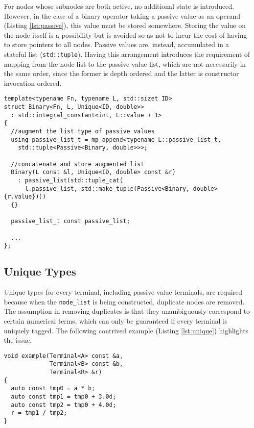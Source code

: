 \documentclass[a4paper,10pt]{article}
\begin{document}
For nodes whose subnodes are both active, no additional state is introduced. However, in the case of a binary
operator taking a passive value as an operand (Listing \ref{lst:passive}), this value must be stored somewhere. Storing the value on
the node itself is a possibility but is avoided so as not to incur the cost of having to store pointers to all nodes. Passive
values are, instead, accumulated in a stateful list (\texttt{std::tuple}). Having this arrangement introduces the requirement
of mapping from the node list to the passive value list, which are not necessarily in the same order, since the former
is depth ordered and the latter is constructor invocation ordered.


\begin{lstlisting}[caption={Mixed arithmetic of active and passive operands.}, label=lst:passive]
template<typename Fn, typename L, std::sizet ID>
struct Binary<Fn, L, Unique<ID, double>>
  : std::integral_constant<int, L::value + 1>
{
  //augment the list type of passive values
  using passive_list_t = mp_append<typename L::passive_list_t,
    std::tuple<Passive<Binary, double>>>;

  //concatenate and store augmented list
  Binary(L const &l, Unique<ID, double> const &r)
    : passive_list(std::tuple_cat(
      l.passive_list, std::make_tuple(Passive<Binary, double>{r.value})))
  {}

  passive_list_t const passive_list;

  ...
};
\end{lstlisting}


\subsection{Unique Types}
Unique types for every terminal, including passive value terminals, are required because when the \texttt{node\_list} is
being constructed, duplicate nodes are removed. The assumption in removing duplicates is that they unambiguously
correspond to certain numerical terms, which can only be guaranteed if every terminal is uniquely tagged. The
following contrived example (Listing \ref{lst:unique}) highlights the issue.


\begin{lstlisting}[caption={Names cannot be extracted and so the type must be the carrier of identity.}, label=lst:unique]
void example(Terminal<A> const &a,
             Terminal<B> const &b,
             Terminal<R> &r)
{
  auto const tmp0 = a * b;
  auto const tmp1 = tmp0 + 3.0d;
  auto const tmp2 = tmp0 + 4.0d;
  r = tmp1 / tmp2;
}
\end{lstlisting}
\end{document}
